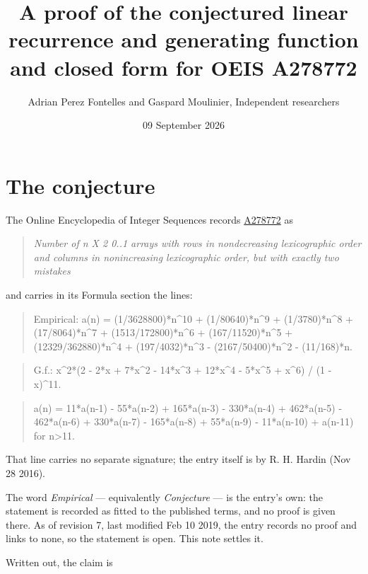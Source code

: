 \documentclass[11pt]{article}
\title{A proof of the conjectured linear recurrence and generating function and closed form for OEIS A278772}
\author{Adrian Perez Fontelles and Gaspard Moulinier, Independent researchers}
\date{09 September 2026}
\theoremstyle{definition}
\begin{document}
\maketitle
\section{The conjecture}

The Online Encyclopedia of Integer Sequences records \href{https://oeis.org/A278772}{A278772} as

\begin{quote}\itshape Number of n X 2 0..1 arrays with rows in nondecreasing lexicographic order and columns in nonincreasing lexicographic order, but with exactly two mistakes\end{quote}

and carries in its Formula section the lines:

\begin{quote}\ttfamily Empirical: a(n) = (1/3628800)*n\textasciicircum{}10 + (1/80640)*n\textasciicircum{}9 + (1/3780)*n\textasciicircum{}8 + (17/8064)*n\textasciicircum{}7 + (1513/172800)*n\textasciicircum{}6 + (167/11520)*n\textasciicircum{}5 + (12329/362880)*n\textasciicircum{}4 + (197/4032)*n\textasciicircum{}3 - (2167/50400)*n\textasciicircum{}2 - (11/168)*n.\end{quote}

\begin{quote}\ttfamily G.f.: x\textasciicircum{}2*(2 - 2*x + 7*x\textasciicircum{}2 - 14*x\textasciicircum{}3 + 12*x\textasciicircum{}4 - 5*x\textasciicircum{}5 + x\textasciicircum{}6) / (1 - x)\textasciicircum{}11.\end{quote}

\begin{quote}\ttfamily a(n) = 11*a(n-1) - 55*a(n-2) + 165*a(n-3) - 330*a(n-4) + 462*a(n-5) - 462*a(n-6) + 330*a(n-7) - 165*a(n-8) + 55*a(n-9) - 11*a(n-10) + a(n-11) for n>11.\end{quote}

That line carries no separate signature; the entry itself is by R. H. Hardin (Nov 28 2016).

The word {\itshape Empirical} --- equivalently {\itshape Conjecture} --- is the entry's own: the statement is recorded as fitted to the published terms, and no proof is given there. As of revision 7, last modified Feb 10 2019, the entry records no proof and links to none, so the statement is open. This note settles it.

Written out, the claim is
\end{document}
